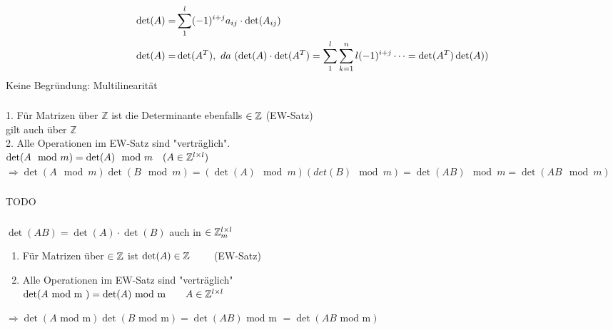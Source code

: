 \documentclass[mitschriften.tex]{subfiles}
\begin{document}
\subsection{}
\subsubsection{}
\begin{align*}
	\det(A) = & \sum_{1}^{l} (-1)^{i+j} a_{ij}\cdot \det (A_{ij})\\
	\det(A) = & \det(A^T), \ da \ (\det(A)\cdot\det(A^T) = \sum_{1}^{l}\sum_{k=1}^{n}{l}(-1)^{i+j}\cdots = \det(A^T)\det(A))  
\end{align*}
Keine Begründung: Multilinearität

\subsubsection{}
1. Für Matrizen über $\mathbb{Z}$ ist die Determinante ebenfalls $\in \mathbb{Z}$ (EW-Satz)\\
gilt auch über $\mathbb{Z}$\\
2. Alle Operationen im EW-Satz sind "verträglich".\\
$\det(A \mod m) = \det(A) \mod m \quad (A \in \mathbb{Z}^{l\times l})$\\
$\Rightarrow \det(A\mod m) \det(B \mod m) = (\det(A) \mod m) (det(B) \mod m) = \det(AB) \mod m = \det(AB \mod m)$

\subsubsection{}
TODO
\subsubsection{}
	$ \det(AB) = \det(A) \cdot \det(B) $ auch in $ \in \mathbb{Z}_m^{l\times l} $
	\begin{enumerate}
		\item Für Matrizen über $ \in \mathbb{Z} $ ist $ \det(A) \in \mathbb{Z} \qquad $ (EW-Satz) 
		\item Alle Operationen im EW-Satz sind "verträglich" \\
		$ \det(A\text{ mod m }) = \det(A) \text{ mod m} \qquad A \in \mathbb{Z}^{l\times l}$
	\end{enumerate}
	$ \Rightarrow \det(A \text{ mod m}) \det(B\text{ mod m}) = \det(AB) \text{ mod m } = \det(AB \text{ mod m}) $

\subsection{}
\subsection{}
\end{document}
